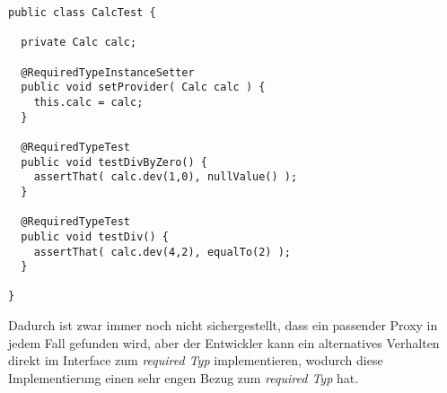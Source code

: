 \begin{lstlisting}[style = java, caption = Test CalcTest, captionpos = b, label = lst_testklasse_calc]
public class CalcTest {

  private Calc calc;
  
  @RequiredTypeInstanceSetter
  public void setProvider( Calc calc ) {
    this.calc = calc;
  }

  @RequiredTypeTest
  public void testDivByZero() {
    assertThat( calc.dev(1,0), nullValue() );
  }
  
  @RequiredTypeTest
  public void testDiv() {
    assertThat( calc.dev(4,2), equalTo(2) );
  }

}
\end{lstlisting}
\noindent
Dadurch ist zwar immer noch nicht sichergestellt, dass ein passender Proxy in jedem Fall gefunden wird, aber der Entwickler kann ein alternatives Verhalten direkt im Interface zum \emph{required Typ} implementieren, wodurch diese Implementierung einen sehr engen Bezug zum \emph{required Typ} hat.